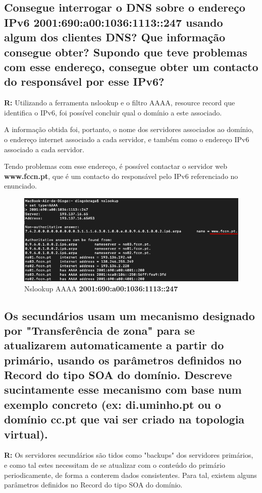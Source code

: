 \documentclass{llncs}
\begin{document}
\subsection{\textbf{Consegue interrogar o DNS sobre o endereço IPv6 2001:690:a00:1036:1113::247 usando algum dos clientes DNS? Que informação consegue obter? Supondo que teve problemas com esse endereço, consegue obter um contacto do responsável por esse IPv6?}}
\textbf{R:} Utilizando a ferramenta nslookup e o filtro AAAA, resource record que identifica o IPv6, foi possível concluir qual o domínio a este associado.

A informação obtida foi, portanto, o nome dos servidores associados ao domínio, o endereço internet associado a cada servidor, e também como o endereço IPv6 associado a cada servidor.

Tendo problemas com esse endereço, é possível contactar o servidor web \textbf{www.fccn.pt}, que é um contacto do responsável pelo IPv6 referenciado no enunciado.


\begin{figure}[H]
\begin{center}
\includegraphics[scale=0.6]{9.png}
\end{center}
\caption{\label{fig:9}Nslookup AAAA \textbf{2001:690:a00:1036:1113::247}}
\end{figure}


\subsection{\textbf{Os secundários usam um mecanismo designado por "Transferência de zona" para se atualizarem automaticamente a partir do primário, usando os parâmetros definidos no Record do tipo SOA do domínio. Descreve sucintamente esse mecanismo com base num exemplo concreto (ex: di.uminho.pt ou o domínio cc.pt que vai ser criado na topologia virtual).}}
\textbf{R:} Os servidores secundários são tidos como "backups" dos servidores primários, e como tal estes necessitam de se atualizar com o conteúdo do primário periodicamente, de forma a conterem dados consistentes. Para tal, existem alguns parâmetros definidos no Record do tipo SOA do domínio.
\end{document}
